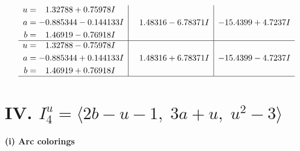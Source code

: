\documentclass[1p]{elsarticle_modified}
\theoremstyle{definition}
\begin{document}
$$\begin{array}{c|c|c}
\begin{aligned}
u &= \phantom{-}1.32788 + 0.75978 I \\
a &= -0.885344 - 0.144133 I \\
b &= \phantom{-}1.46919 - 0.76918 I\end{aligned}
 & \phantom{-}1.48316 - 6.78371 I & -15.4399 + 4.7237 I \\ \hline\begin{aligned}
u &= \phantom{-}1.32788 - 0.75978 I \\
a &= -0.885344 + 0.144133 I \\
b &= \phantom{-}1.46919 + 0.76918 I\end{aligned}
 & \phantom{-}1.48316 + 6.78371 I & -15.4399 - 4.7237 I\\
 \hline 
 \end{array}$$\newpage\newpage\renewcommand{\arraystretch}{1}
\centering \section*{IV. $I^u_{4}= \langle 2 b- u-1,\;3 a+u,\;u^2-3 \rangle$}
\flushleft \textbf{(i) Arc colorings}\\
\end{document}
